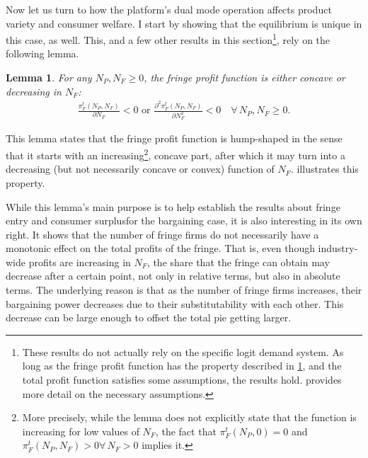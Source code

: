 \documentclass[a4paper]{article}
\newtheorem{lemma}{Lemma}
\begin{document}
Now let us turn to how the platform's dual mode operation affects product variety and consumer welfare.
I start by showing that the equilibrium is unique in this case, as well.
This, and a few other results in this section\footnote{
    These results do not actually rely on the specific logit demand system.
    As long as the fringe profit function has the property described in \cref{lem:shape_of_fringe_profit}, and the total profit function satisfies some assumptions, the results hold.
     provides more detail on the necessary assumptions.
}, rely on the following lemma.
\begin{lemma}
    \label{lem:shape_of_fringe_profit}
    For any $N_P, N_F \geq 0$, the fringe profit function is either concave or decreasing in $N_F$:
    \begin{align*}
        \frac{\pi_F^t(N_P, N_F)}{\partial N_F} < 0 \text{ or } \frac{\partial^2 \pi_F^t(N_P, N_F)}{\partial N_F^2} < 0 \quad \forall\, N_P, N_F \geq 0.
    \end{align*}
\end{lemma}
This lemma states that the fringe profit function is hump-shaped in the sense that it starts with an increasing\footnote{
    More precisely, while the lemma does not explicitly state that the function is increasing for low values of $N_F$, the fact that $\pi_F^t(N_P, 0) = 0$ and $\pi_F^t(N_P, N_F) > 0 \forall\, N_F > 0$ implies it.
}, concave part, after which it may turn into a decreasing (but not necessarily concave or convex) function of $N_F$.
 illustrates this property.

While this lemma's main purpose is to help establish the results about fringe entry and consumer surplusfor the bargaining case, it is also interesting in its own right.
It shows that the number of fringe firms do not necessarily have a monotonic effect on the total profits of the fringe.
That is, even though industry-wide profits are increasing in $N_F$, the share that the fringe can obtain may decrease after a certain point, not only in relative terms, but also in absolute terms.
The underlying reason is that as the number of fringe firms increases, their bargaining power decreases due to their substitutability with each other.
This decrease can be large enough to offset the total pie getting larger.
\end{document}
